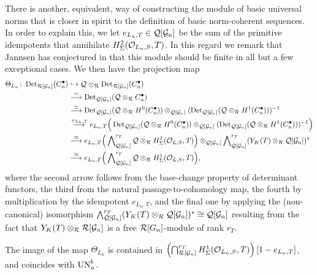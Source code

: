 \documentclass[a4paper, 
headsepline=off, DIV=12, titlepage=false]{scrartcl}
\begin{document}
There is another, equivalent, way of constructing the module of basic universal norms that is closer in spirit to the definition of basic norm-coherent sequences. In order to explain this, we let $e_{L_n, T} \in \mathcal{Q}[\mathcal{G}_n]$ be the sum of the primitive idempotents that annihilate $H^2_\Sigma (\mathcal{O}_{L_n, S}, T)$. In this regard we remark that Jannsen has conjectured in \cite[Conj.\@ 1]{jannsen} that this module should be finite in all but a few exceptional cases. We then have the projection map
\begin{align*}
    \Theta_{L_n} \colon \operatorname{Det}_{\mathcal{R} [\mathcal{G}_n]} (C^\bullet_n) & \hookrightarrow
    \mathcal{Q} \otimes_{\mathcal{R}} \operatorname{Det}_{\mathcal{R} [\mathcal{G}_n]} (C^\bullet_n) \\
    & \stackrel{\simeq}{\longrightarrow} \operatorname{Det}_{\mathcal{Q}[\mathcal{G}_n]} ( \mathcal{Q} \otimes_{\mathcal{R}} C^\bullet_n) \\
    & \stackrel{\simeq}{\longrightarrow} \operatorname{Det}_{\mathcal{Q} [\mathcal{G}_n]} ( \mathcal{Q} \otimes_{\mathcal{R}} H^0 (C^\bullet_n)) \otimes_{\mathcal{Q} [\mathcal{G}_n]} ( \operatorname{Det}_{\mathcal{Q} [\mathcal{G}_n]} ( \mathcal{Q} \otimes_{\mathcal{R}} H^1 (C^\bullet_n)))^{-1} \\
    & \stackrel{\cdot e_{L_n, T}}{\longrightarrow} 
    e_{L_n, T} \Big ( \operatorname{Det}_{\mathcal{Q} [\mathcal{G}_n]} ( \mathcal{Q} \otimes_{\mathcal{R}} H^0 (C^\bullet_n)) \otimes_{\mathcal{Q} [\mathcal{G}_n]}  ( \operatorname{Det}_{\mathcal{Q} [\mathcal{G}_n]} ( \mathcal{Q} \otimes_{\mathcal{R}} H^1 (C^\bullet_n)))^{-1} \Big ) \\
    & \stackrel{\simeq}{\longrightarrow} e_{L_n, T}  \Big ( \bigwedge\nolimits^{r_T}_{\mathcal{Q} [\mathcal{G}_n]} \mathcal{Q} \otimes_{\mathcal{R}} H^1_\Sigma (\mathcal{O}_{L, S}, T) \Big )
    \otimes_{\mathcal{Q} [\mathcal{G}_n]}  \bigwedge\nolimits^{r_T}_{\mathcal{Q} [\mathcal{G}_n]} ( Y_K (T) \otimes_{\mathcal{R}} \mathcal{Q} [\mathcal{G}_n])^\ast \\
    & \stackrel{\simeq}{\longrightarrow} 
    e_{L_n, T}  \Big ( \bigwedge\nolimits^{r_T}_{\mathcal{Q} [\mathcal{G}_n]} \mathcal{Q} \otimes_{\mathcal{R}} H^1_\Sigma (\mathcal{O}_{L, S}, T) \Big ),
\end{align*}
where the second arrow follows from the base-change property of determinant functors, the third from the natural passage-to-cohomology map, the fourth by multiplication by the idempotent $e_{L_n, T}$, and the final one by applying the (non-canonical) isomorphism $ \bigwedge\nolimits^{r_T}_{\mathcal{Q} [\mathcal{G}_n]} ( Y_K (T) \otimes_{\mathcal{R}} \mathcal{Q} [\mathcal{G}_n])^\ast \cong \mathcal{Q} [\mathcal{G}_n]$ resulting from the fact that $Y_K (T) \otimes_{\mathcal{R}} \mathcal{R} [\mathcal{G}_n]$ is a free $\mathcal{R} [G_n]$-module of rank $r_T$. 

\begin{lem} \label{FiniteLem}
The image of the map $\Theta_{L_n}$ is contained in $\left( \bigcap\nolimits^{r_T}_{\mathcal{R} [\mathcal{G}_n]} H^1_\Sigma (\mathcal{O}_{L_n, S}, T) \right ) [1 - e_{L_n, T}]$, and coincides with $\mathrm{UN}^b_n$.
\end{lem}
\end{document}
